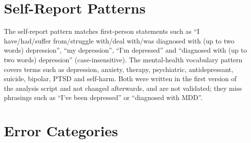 \documentclass[11pt]{article}
\begin{document}
\begin{table}[t]
\centering\scriptsize
\resizebox{\textwidth}{!}{}
\caption{Pre-specified paired comparisons. Families: 1 references, 2 TF-IDF baseline, 3 feature groups and control. Differences are A $-$ B, mean over repeats. 74 feat.: PHQ + 3 LIWC + LSM alignment; 4 LSM: four count-LSM scores. Holm values of .004 and .002 are the smallest attainable with 2000 draws.}
\label{tab:pairs}
\end{table}

\section{Self-Report Patterns}
\label{app:sr}

The self-report pattern matches first-person statements such as ``I have/had/suffer from/struggle with/deal with/was diagnosed with (up to two words) depression'', ``my depression'', ``I'm depressed'' and ``diagnosed with (up to two words) depression'' (case-insensitive).
The mental-health vocabulary pattern covers terms such as depression, anxiety, therapy, psychiatric, antidepressant, suicide, bipolar, PTSD and self-harm.
Both were written in the first version of the analysis script and not changed afterwards, and are not validated; they miss phrasings such as ``I've been depressed'' or ``diagnosed with MDD''.

\section{Error Categories}
\label{app:errors}
\end{document}

